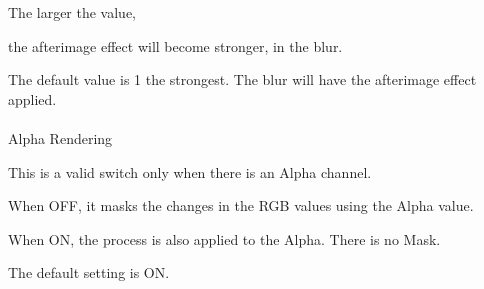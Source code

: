 \documentclass[a4paper,12pt]{article}
\begin{document}
The larger the value,\par
the afterimage effect will become stronger, in the blur.\par
The default value is 1 the strongest. The blur will have the afterimage effect applied.\\
\\
Alpha Rendering\par
This is a valid switch only when there is an Alpha channel.\par
When OFF, it masks the changes in the RGB values using the Alpha value.\par
When ON, the process is also applied to the Alpha. There is no Mask.\par
The default setting is ON.
\end{document}
